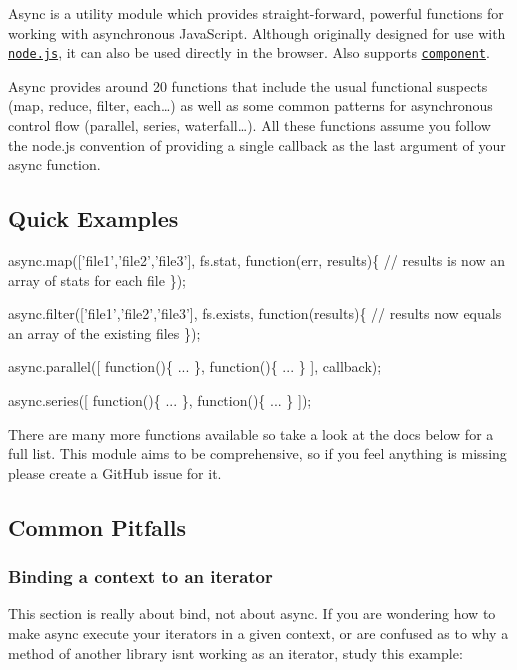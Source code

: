 Async is a utility module which provides straight-\/forward, powerful functions for working with asynchronous Java\+Script. Although originally designed for use with \href{http://nodejs.org}{\tt node.\+js}, it can also be used directly in the browser. Also supports \href{https://github.com/component/component}{\tt component}.

Async provides around 20 functions that include the usual \textquotesingle{}functional\textquotesingle{} suspects (map, reduce, filter, each…) as well as some common patterns for asynchronous control flow (parallel, series, waterfall…). All these functions assume you follow the node.\+js convention of providing a single callback as the last argument of your async function.

\subsection*{Quick Examples}


\begin{DoxyCode}
async.map(['file1','file2','file3'], fs.stat, function(err, results)\{
    // results is now an array of stats for each file
\});

async.filter(['file1','file2','file3'], fs.exists, function(results)\{
    // results now equals an array of the existing files
\});

async.parallel([
    function()\{ ... \},
    function()\{ ... \}
], callback);

async.series([
    function()\{ ... \},
    function()\{ ... \}
]);
\end{DoxyCode}


There are many more functions available so take a look at the docs below for a full list. This module aims to be comprehensive, so if you feel anything is missing please create a Git\+Hub issue for it.

\subsection*{Common Pitfalls}

\subsubsection*{Binding a context to an iterator}

This section is really about bind, not about async. If you are wondering how to make async execute your iterators in a given context, or are confused as to why a method of another library isn\textquotesingle{}t working as an iterator, study this example\+:

